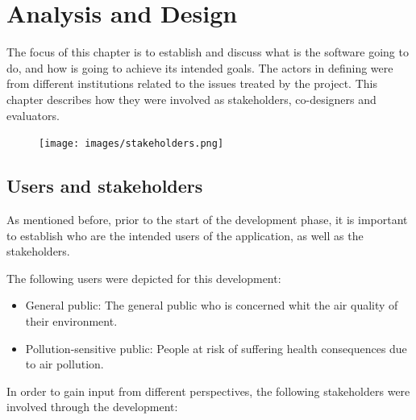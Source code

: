 \chapter{Analysis and Design}
The focus of this chapter is to establish and discuss what is the software going to do, and how is going to achieve its intended goals. The actors in defining were from different institutions related to the issues treated by the project. This chapter describes how they were involved as stakeholders, co-designers and evaluators. 

\begin{figure}[h]
\begin{adjustbox}{width=1\textwidth,center=\textwidth}
  \centering
  \texttt{[image: images/stakeholders.png]}
\end{adjustbox}
  \caption[]{}
  \label{fig:stakeholders}
\end{figure}


\section{Users and stakeholders}
As mentioned before, prior to the start of the development phase, it is important to establish who are the intended users of the application, as well as the stakeholders. 

The following users were depicted for this development:

\begin{itemize}
	\item General public: The general public who is concerned whit the air quality of their environment.
    \item Pollution-sensitive public: People at risk of suffering health consequences due to air pollution.
\end{itemize}

In order to gain input from different perspectives, the following stakeholders were involved through the development: 

